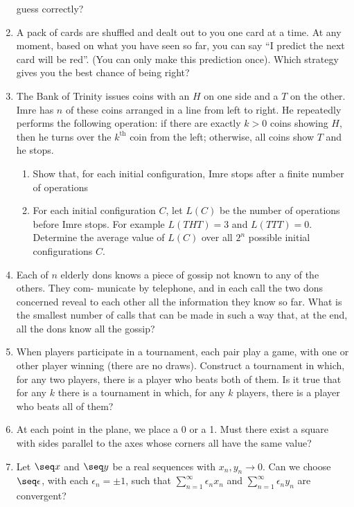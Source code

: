 \documentclass[12pt,a4paper]{article}
\begin{document}
\begin{enumerate}
  guess correctly?
 \item
  A pack of cards are shuffled and dealt out to you one card at a time. At any
  moment, based on what you have seen so far, you can say ``I predict the next
  card will be red''. (You can only make this prediction once). Which strategy
  gives you the best chance of being right?
 \item
  The Bank of Trinity issues coins with an \(H\) on one side and a \(T\) on the
  other. Imre has \(n\) of these coins arranged in a line from left to right. He
  repeatedly performs the following operation: if there are exactly \(k > 0\)
  coins showing \(H\), then he turns over the \(k^{\text{th}}\) coin from the
  left; otherwise, all coins show \(T\) and he stops.
  \begin{enumerate}
   \item
    Show that, for each initial configuration, Imre stops after a finite number
    of operations
   \item
    For each initial configuration \(C\), let \(L(C)\) be the number of
    operations before Imre stops. For example \(L(\mathit{THT}) = 3\) and
    \(L(\mathit{TTT}) = 0\). Determine the average value of \(L(C)\) over all
    \(2^n\) possible initial configurations \(C\).
  \end{enumerate}
 \item
  Each of \(n\) elderly dons knows a piece of gossip not known to any of the
  others. They com- municate by telephone, and in each call the two dons
  concerned reveal to each other all the information they know so far. What is
  the smallest number of calls that can be made in such a way that, at the end,
  all the dons know all the gossip?
 \item
  When players participate in a tournament, each pair play a game, with one or
  other player winning (there are no draws). Construct a tournament in which,
  for any two players, there is a player who beats both of them. Is it true that
  for any \(k\) there is a tournament in which, for any \(k\) players, there is
  a player who beats all of them?
 \item
  At each point in the plane, we place a 0 or a 1. Must there exist a square
  with sides parallel to the axes whose corners all have the same value?
 \item
  Let \(\seq x\) and \(\seq y\) be a real sequences with \(x_n, y_n \to 0\). Can
  we choose \(\seq \epsilon\), with each \(\epsilon_n = \pm 1\), such that
  \(\sum_{n = 1}^\infty \epsilon_n x_n\) and
  \(\sum_{n = 1}^\infty \epsilon_n y_n\) are convergent?

\end{enumerate}
\end{document}
